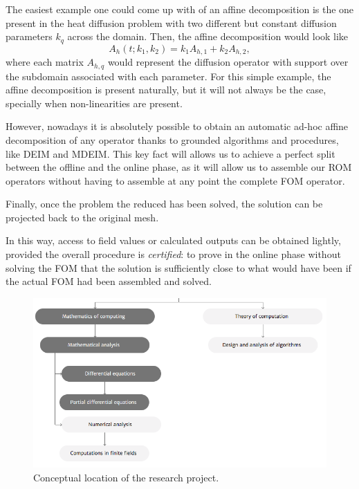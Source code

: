 \documentclass[a4paper, technote, compsoc]{IEEEtran}
\begin{document}
The easiest example one could come up with of an affine decomposition is the one present in the heat diffusion problem with two different but constant diffusion parameters $k_q$ across the domain.
Then, the affine decomposition would look like
\begin{equation*}
   A_h\left(t;k_1, k_2\right) = k_{1} A_{h,1} + k_{2} A_{h,2},
\end{equation*}
where each matrix $A_{h,q}$ would represent the diffusion operator with support over the subdomain associated with each parameter. 
For this simple example, the affine decomposition is present naturally, but it will not always be the case, specially when non-linearities are present. 

However, nowadays it is absolutely possible to obtain an automatic ad-hoc affine decomposition of any operator thanks to grounded algorithms and procedures, like DEIM and MDEIM.
This key fact will allows us to achieve a perfect split between the offline and the online phase, as it will allow us to assemble our ROM operators without having to assemble at any point the complete FOM operator. 

Finally, once the problem the reduced has been solved, the solution can be projected back to the original mesh. 

In this way, access to field values or calculated outputs can be obtained lightly, provided the overall procedure is \textit{certified}: to prove in the online phase without solving the FOM that the solution is sufficiently close to what would have been if the actual FOM had been assembled and solved.



\begin{figure}[h]
   \includegraphics[width=\columnwidth]{figures/index.png}
   \caption{Conceptual location of the research project.}
\end{figure}
\end{document}
